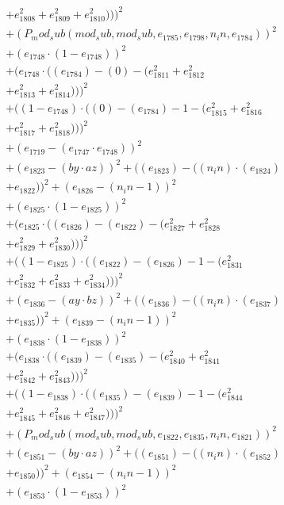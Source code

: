 \documentclass[10pt, a4paper]{article}
\begin{document}
\begin{align*}
& + e_{1808}^{2} + e_{1809}^{2} + e_{1810}^{2})))^{2} \\
& + (P_mod_sub(mod_sub, mod_sub, e_{1785}, e_{1798}, n_in, e_{1784}))^{2} \\
& + (e_{1748}  \cdot  (1 - e_{1748}))^{2} \\
& + (e_{1748}  \cdot  ((e_{1784}) - (0) - (e_{1811}^{2} + e_{1812}^{2} \\
& + e_{1813}^{2} + e_{1814}^{2})))^{2} \\
& + ((1 - e_{1748})  \cdot  ((0) - (e_{1784}) - 1 - (e_{1815}^{2} + e_{1816}^{2} \\
& + e_{1817}^{2} + e_{1818}^{2})))^{2} \\
& + (e_{1719} - (e_{1747}  \cdot  e_{1748}))^{2} \\
& + (e_{1823} - (by  \cdot  az))^{2} + ((e_{1823}) - ((n_in)  \cdot  (e_{1824}) \\
& + e_{1822}))^{2} + (e_{1826} - (n_in - 1))^{2} \\
& + (e_{1825}  \cdot  (1 - e_{1825}))^{2} \\
& + (e_{1825}  \cdot  ((e_{1826}) - (e_{1822}) - (e_{1827}^{2} + e_{1828}^{2} \\
& + e_{1829}^{2} + e_{1830}^{2})))^{2} \\
& + ((1 - e_{1825})  \cdot  ((e_{1822}) - (e_{1826}) - 1 - (e_{1831}^{2} \\
& + e_{1832}^{2} + e_{1833}^{2} + e_{1834}^{2})))^{2} \\
& + (e_{1836} - (ay  \cdot  bz))^{2} + ((e_{1836}) - ((n_in)  \cdot  (e_{1837}) \\
& + e_{1835}))^{2} + (e_{1839} - (n_in - 1))^{2} \\
& + (e_{1838}  \cdot  (1 - e_{1838}))^{2} \\
& + (e_{1838}  \cdot  ((e_{1839}) - (e_{1835}) - (e_{1840}^{2} + e_{1841}^{2} \\
& + e_{1842}^{2} + e_{1843}^{2})))^{2} \\
& + ((1 - e_{1838})  \cdot  ((e_{1835}) - (e_{1839}) - 1 - (e_{1844}^{2} \\
& + e_{1845}^{2} + e_{1846}^{2} + e_{1847}^{2})))^{2} \\
& + (P_mod_sub(mod_sub, mod_sub, e_{1822}, e_{1835}, n_in, e_{1821}))^{2} \\
& + (e_{1851} - (by  \cdot  az))^{2} + ((e_{1851}) - ((n_in)  \cdot  (e_{1852}) \\
& + e_{1850}))^{2} + (e_{1854} - (n_in - 1))^{2} \\
& + (e_{1853}  \cdot  (1 - e_{1853}))^{2} \\

\end{align*}
\end{document}
